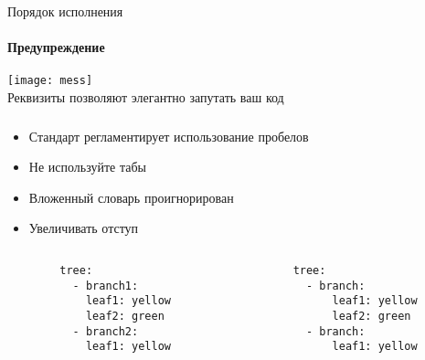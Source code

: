 \begin{frame}{Порядок исполнения}
  \framesubtitle{Предупреждение}
  \begin{center}
    \texttt{[image: mess]}\\
    \inlineicon{\faRecycle} Реквизиты позволяют элегантно запутать ваш код
      \inlineicon{\faBug}
  \end{center}
\end{frame}

\liveframe{}

\begin{frame}[fragile]
  \frametitle{\Insertsubsection}

  \begin{itemize}[<+-| alert@ +>]
    \item[{\faFrown[regular]}] Стандарт регламентирует использование пробелов
    \item[{\faCheckCircle[regular]}] Не используйте табы

    \vfill

    \item[{\faFrown[regular]}] Вложенный словарь проигнорирован
    \item[{\faCheckCircle[regular]}] Увеличивать отступ
  \end{itemize}

  \vfill

  \begin{columns}
    \begin{column}{0.3\textwidth}
      \begin{verbatim}
        tree:
          - branch1:
            leaf1: yellow
            leaf2: green
          - branch2:
            leaf1: yellow
      \end{verbatim}
    \end{column}

    \begin{column}{0.3\textwidth}
      \begin{verbatim}
        tree:
          - branch:
              leaf1: yellow
              leaf2: green
          - branch:
              leaf1: yellow
      \end{verbatim}
    \end{column}
  \end{columns}

\end{frame}

